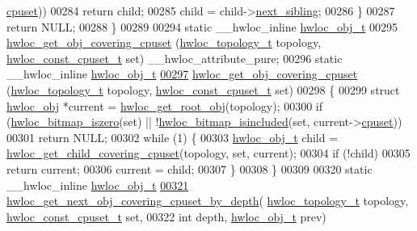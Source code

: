 \begin{DoxyCode}
      \hyperlink{a00238_a67925e0f2c47f50408fbdb9bddd0790f}{cpuset}))
00284       \textcolor{keywordflow}{return} child;
00285     child = child->\hyperlink{a00238_a7f2343ed476fe4942e6fffd4cade1b40}{next\_sibling};
00286   \}
00287   \textcolor{keywordflow}{return} NULL;
00288 \}
00289 
00294 \textcolor{keyword}{static} \_\_hwloc\_inline \hyperlink{a00238}{hwloc\_obj\_t}
00295 \hyperlink{a00196_ga41acdcdbb8b95d70ecf6c572a3f67dca}{hwloc\_get\_obj\_covering\_cpuset} (\hyperlink{a00186_ga9d1e76ee15a7dee158b786c30b6a6e38}{hwloc\_topology\_t} topology, 
      \hyperlink{a00183_ga1f784433e9b606261f62d1134f6a3b25}{hwloc\_const\_cpuset\_t} \textcolor{keyword}{set}) \_\_hwloc\_attribute\_pure;
00296 \textcolor{keyword}{static} \_\_hwloc\_inline \hyperlink{a00238}{hwloc\_obj\_t}
\hyperlink{a00196_ga41acdcdbb8b95d70ecf6c572a3f67dca}{00297} \hyperlink{a00196_ga41acdcdbb8b95d70ecf6c572a3f67dca}{hwloc\_get\_obj\_covering\_cpuset} (\hyperlink{a00186_ga9d1e76ee15a7dee158b786c30b6a6e38}{hwloc\_topology\_t} topology, 
      \hyperlink{a00183_ga1f784433e9b606261f62d1134f6a3b25}{hwloc\_const\_cpuset\_t} \textcolor{keyword}{set})
00298 \{
00299   \textcolor{keyword}{struct }\hyperlink{a00238}{hwloc\_obj} *current = \hyperlink{a00187_ga2d4b12fc187dfc53b35f2fa21d21044d}{hwloc\_get\_root\_obj}(topology);
00300   \textcolor{keywordflow}{if} (\hyperlink{a00205_ga5b64be28f5a7176ed8ad0d6a90bdf108}{hwloc\_bitmap\_iszero}(\textcolor{keyword}{set}) || !\hyperlink{a00205_ga0526e03db81956fb02acc8260b66d6a4}{hwloc\_bitmap\_isincluded}(\textcolor{keyword}{set}, 
      current->\hyperlink{a00238_a67925e0f2c47f50408fbdb9bddd0790f}{cpuset}))
00301     \textcolor{keywordflow}{return} NULL;
00302   \textcolor{keywordflow}{while} (1) \{
00303     \hyperlink{a00238}{hwloc\_obj\_t} child = \hyperlink{a00196_ga0e66aa2dc6b2527cfd10723af646c9d7}{hwloc\_get\_child\_covering\_cpuset}(topology,
       \textcolor{keyword}{set}, current);
00304     \textcolor{keywordflow}{if} (!child)
00305       \textcolor{keywordflow}{return} current;
00306     current = child;
00307   \}
00308 \}
00309 
00320 \textcolor{keyword}{static} \_\_hwloc\_inline \hyperlink{a00238}{hwloc\_obj\_t}
\hyperlink{a00196_gaba4b6d86eba1169ced4b0e941d2bb5f0}{00321} \hyperlink{a00196_gaba4b6d86eba1169ced4b0e941d2bb5f0}{hwloc\_get\_next\_obj\_covering\_cpuset\_by\_depth}(
      \hyperlink{a00186_ga9d1e76ee15a7dee158b786c30b6a6e38}{hwloc\_topology\_t} topology, \hyperlink{a00183_ga1f784433e9b606261f62d1134f6a3b25}{hwloc\_const\_cpuset\_t} \textcolor{keyword}{set},
00322                                             \textcolor{keywordtype}{int} depth, \hyperlink{a00238}{hwloc\_obj\_t} prev)

\end{DoxyCode}
